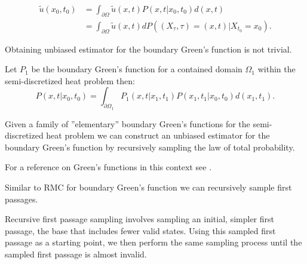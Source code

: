 \documentclass[a4paper,12pt]{article}
\begin{document}
\begin{align}
    \tilde{u}(x_{0},t_{0}) & = \int_{\partial \Omega} \tilde{u}(x,t) P(x,t|x_{0},t_{0}) d(x,t)                    \\
                           & = \int_{\partial \Omega} \tilde{u}(x,t)  dP((X_{\tau},\tau) = (x,t)| X_{t_0} = x_0 )
    .
\end{align}


Obtaining unbiased estimator for the boundary Green's function is not trivial.

\begin{lemma}
    Let $P_{1}$ be the boundary Green's function for a contained domain $\Omega_{1}$ within the semi-discretized heat problem
    then:
    \begin{equation}
        P(x,t|x_{0},t_{0})= \int_{\partial \Omega_{1}} P_{1}(x,t|x_{1},t_{1}) P(x_{1},t_{1}|x_{0},t_{0}) d(x_{1},t_{1})
        .
    \end{equation}
\end{lemma}

Given a family of ''elementary'' boundary Green's functions for the semi-discretized heat problem we can construct
an unbiased estimator for the boundary Green's function by recursively sampling the law of total probability. \\

\begin{related}
    For a reference on Green's functions in this context see \cite{qi_bidirectional_2022}.
\end{related}

Similar to RMC for boundary Green's function we can recursively sample first passages.

\begin{technique}
    Recursive first passage sampling involves sampling an initial,
    simpler first passage, the base that includes fewer valid states. Using
    this sampled first passage as a starting point, we
    then perform the same sampling process until the sampled
    first passage is almost invalid.
\end{technique}
\end{document}
